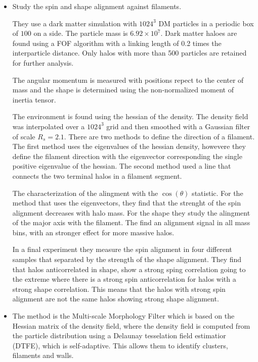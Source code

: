 \documentclass[usenatbib]{mn2e}
\newcommand{\hMpc}{{\ifmmode{h^{-1}{\rm Mpc}}\else{$h^{-1}$Mpc }\fi}}
\newcommand{\hMsun}{{\ifmmode{h^{-1}{\rm
        {M_{\odot}}}}\else{$h^{-1}{\rm{M_{\odot}}}$}\fi}}
\begin{document}
\begin{itemize}
\item
\citep{Zhang2009}
Study the spin and shape alignment against filaments. 

They use a dark matter simulation with $1024^3$ DM particles in a
periodic box of $100$ \hMpc on a side. The particle mass is
$6.92\times10^{7}$\hMsun. Dark matter haloes are found using a FOF
algorithm with a linking length of 0.2 times the interparticle
distance. Only halos with more than 500 particles are retained for
further analysis. 

The angular momentum is measured with positions repect to the center
of mass and the shape is determined using the non-normalized moment of
inertia tensor.

The environment is found using the hessian of the density. The density
field was interpolated over a $1024^3$ grid and then smoothed with a
Gaussian filter of scale $R_{s} = 2.1$\hMpc. There are two methods to
define the direction of a filament. The first method uses the
eigenvalues of the hessian density, howevere they define the filament
direction with the eigenvector corresponding the single positive
eigenvalue of the hessian. The second method used a line that
connects the two terminal halos in a filament segment.


The characterization of the alingment with the $\cos(\theta)$
statistic. For the method that uses the eigenvectors, they find that
the strenght of the spin alignment decreases with halo mass. For the
shape they study the alingment of the major axis with the
filament. The find an alignment signal in all mass bins, with an stronger
effect for more massive halos. 

In a final experiment they measure the spin alignment in four
different samples that separated by the strength of the shape
alignment. They find that halos anticorrelated in shape, show a strong
sping correlation going to the extreme where there is a strong spin
anticorrelation for halos with a strong shape correlation. This means
that the halos with strong spin alignment are not the same halos
showing strong shape alignment. 


\item 
\citep{AragonCalvo2007} %
The method is the Multi-scale Morphology Filter which is based on the
Hessian matrix of the density field, where the density field is
computed from the particle distribution using a Delaunay tesselation
field estimatior (DTFE), which is self-adaptive. This allows them to
identify clusters, filaments and walls.



\end{itemize}
\end{document}
